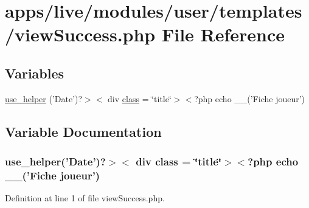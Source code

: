 \hypertarget{live_2modules_2user_2templates_2view_success_8php}{\section{apps/live/modules/user/templates/view\-Success.php File Reference}
\label{live_2modules_2user_2templates_2view_success_8php}
}
\subsection*{Variables}
\begin{DoxyCompactItemize}
\item 
\hyperlink{live_2modules_2user_2templates_2view_success_8php_af7021ad5f4c3d81ef96691bf68712c7a}{use\-\_\-helper} ('Date')?$>$$<$ div \hyperlink{live_2modules_2news_2templates_2__actualitelight_8php_a185c73c6507391d1eb38c776b68ce96d}{class} = \char`\"{}title\char`\"{}$>$$<$?php echo \-\_\-\-\_\-('Fiche joueur')
\end{DoxyCompactItemize}


\subsection{Variable Documentation}
\hypertarget{live_2modules_2user_2templates_2view_success_8php_af7021ad5f4c3d81ef96691bf68712c7a}{
\subsubsection[{use\-\_\-helper}]{\setlength{\rightskip}{0pt plus 5cm}use\-\_\-helper('Date')?$>$$<$ div {\bf class} = \char`\"{}title\char`\"{}$>$$<$?php echo \-\_\-\-\_\-('Fiche joueur')}}\label{live_2modules_2user_2templates_2view_success_8php_af7021ad5f4c3d81ef96691bf68712c7a}


Definition at line 1 of file view\-Success.\-php.

